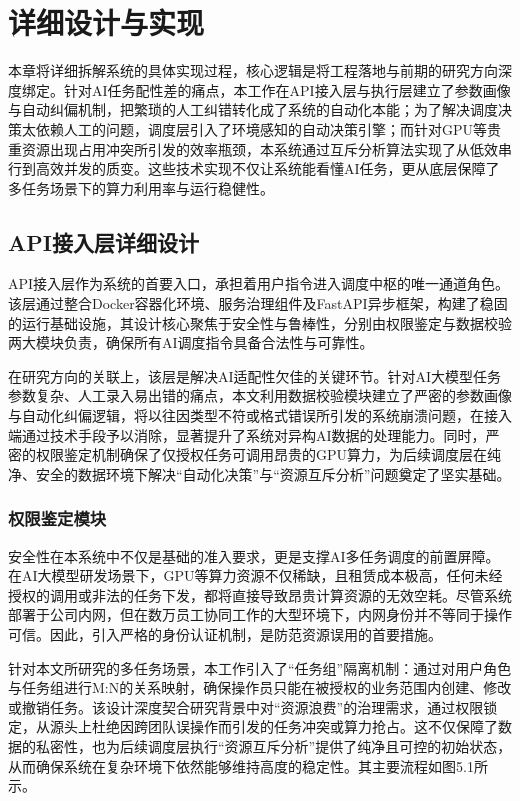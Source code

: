 \chapter{详细设计与实现}

本章将详细拆解系统的具体实现过程，核心逻辑是将工程落地与前期的研究方向深度绑定。针对AI任务配性差的痛点，本工作在API接入层与执行层建立了参数画像与自动纠偏机制，把繁琐的人工纠错转化成了系统的自动化本能；为了解决调度决策太依赖人工的问题，调度层引入了环境感知的自动决策引擎；而针对GPU等贵重资源出现占用冲突所引发的效率瓶颈，本系统通过互斥分析算法实现了从低效串行到高效并发的质变。这些技术实现不仅让系统能看懂AI任务，更从底层保障了多任务场景下的算力利用率与运行稳健性。

\section{API接入层详细设计}

API接入层作为系统的首要入口，承担着用户指令进入调度中枢的唯一通道角色。该层通过整合Docker容器化环境、服务治理组件及FastAPI异步框架，构建了稳固的运行基础设施，其设计核心聚焦于安全性与鲁棒性，分别由权限鉴定与数据校验两大模块负责，确保所有AI调度指令具备合法性与可靠性。

在研究方向的关联上，该层是解决AI适配性欠佳的关键环节。针对AI大模型任务参数复杂、人工录入易出错的痛点，本文利用数据校验模块建立了严密的参数画像与自动化纠偏逻辑，将以往因类型不符或格式错误所引发的系统崩溃问题，在接入端通过技术手段予以消除，显著提升了系统对异构AI数据的处理能力。同时，严密的权限鉴定机制确保了仅授权任务可调用昂贵的GPU算力，为后续调度层在纯净、安全的数据环境下解决“自动化决策”与“资源互斥分析”问题奠定了坚实基础。

\subsection{权限鉴定模块}

安全性在本系统中不仅是基础的准入要求，更是支撑AI多任务调度的前置屏障。在AI大模型研发场景下，GPU等算力资源不仅稀缺，且租赁成本极高，任何未经授权的调用或非法的任务下发，都将直接导致昂贵计算资源的无效空耗。尽管系统部署于公司内网，但在数万员工协同工作的大型环境下，内网身份并不等同于操作可信。因此，引入严格的身份认证机制，是防范资源误用的首要措施。

针对本文所研究的多任务场景，本工作引入了“任务组”隔离机制：通过对用户角色与任务组进行M:N的关系映射，确保操作员只能在被授权的业务范围内创建、修改或撤销任务。该设计深度契合研究背景中对“资源浪费”的治理需求，通过权限锁定，从源头上杜绝因跨团队误操作而引发的任务冲突或算力抢占。这不仅保障了数据的私密性，也为后续调度层执行“资源互斥分析”提供了纯净且可控的初始状态，从而确保系统在复杂环境下依然能够维持高度的稳定性。其主要流程如图5.1所示。


